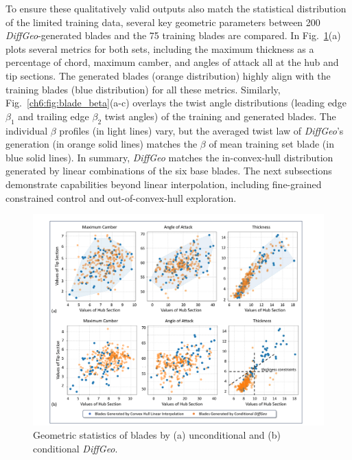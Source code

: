 To ensure these qualitatively valid outputs also match the statistical distribution of the limited training data, several key geometric parameters between 200 \textit{DiffGeo}-generated blades and the 75 training blades are compared. In Fig.~\ref{ch6:fig:blade_stats}(a) plots several metrics for both sets, including the maximum thickness as a percentage of chord, maximum camber, and angles of attack all at the hub and tip sections. The generated blades (orange distribution) highly align with the training blades (blue distribution) for all these metrics. Similarly, Fig.~\ref{ch6:fig:blade_beta}(a-c) overlays the twist angle distributions (leading edge $\beta_1$ and trailing edge $\beta_2$ twist angles) of the training and generated blades. The individual $\beta$ profiles (in light lines) vary, but the averaged twist law of \textit{DiffGeo}'s generation (in orange solid lines)  matches the $\beta$ of mean training set blade (in blue solid lines). In summary, \textit{DiffGeo} matches the in-convex-hull distribution generated by linear combinations of the six base blades. The next subsections demonstrate capabilities beyond linear interpolation, including fine-grained constrained control and out-of-convex-hull exploration.

\begin{figure}[!htb]
    \begin{center}
        \includegraphics[width=1\linewidth]{chapter6/fig/fig_blade_stats.pdf}
    \end{center}
    \caption{
        \small Geometric statistics of blades by (a) unconditional and (b) conditional \textit{DiffGeo}.
    }
    \label{ch6:fig:blade_stats}
\end{figure}

